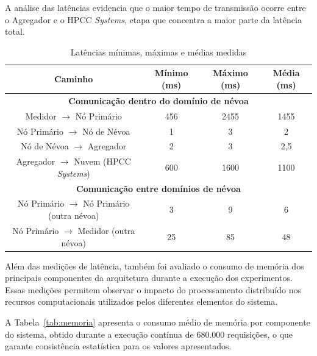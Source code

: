 A análise das latências evidencia que o maior tempo de transmissão ocorre entre o Agregador e o \gls{HPCC} \textit{Systems}, etapa que concentra a maior parte da latência total.

\begin{table}[htb]
    \caption{\label{tab:latencias}Latências mínimas, máximas e médias medidas}
    \centering
    \begin{tabular}{|c|c|c|c|}
        \hline
        \textbf{Caminho} & \textbf{Mínimo (ms)} & \textbf{Máximo (ms)} & \textbf{Média (ms)} \\ 
        \hline

        \multicolumn{4}{|c|}{\textbf{Comunicação dentro do domínio de névoa}} \\ 
        \hline

        Medidor $\rightarrow$ Nó Primário & 456 & 2455 & 1455 \\ \hline
        Nó Primário $\rightarrow$ Nó de Névoa & 1 & 3 & 2 \\ \hline
        Nó de Névoa $\rightarrow$ Agregador & 2 & 3 & 2,5 \\ \hline
        Agregador $\rightarrow$ Nuvem (\gls{HPCC} \textit{Systems}) & 600 & 1600 & 1100 \\ 
        \hline

        \multicolumn{4}{|c|}{\textbf{Comunicação entre domínios de névoa}} \\ 
        \hline

        Nó Primário $\rightarrow$ Nó Primário (outra névoa) & 3 & 9 & 6 \\ \hline
        Nó Primário $\rightarrow$ Medidor (outra névoa) & 25 & 85 & 48 \\ 
        \hline

    \end{tabular}
\end{table}

Além das medições de latência, também foi avaliado o consumo de memória dos principais componentes da arquitetura durante a execução dos experimentos. Essas medições permitem observar o impacto do processamento distribuído nos recursos computacionais utilizados pelos diferentes elementos do sistema.

A Tabela~\ref{tab:memoria} apresenta o consumo médio de memória por componente do sistema, obtido durante a execução contínua de 680.000 requisições, o que garante consistência estatística para os valores apresentados.

